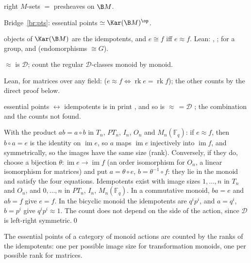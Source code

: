 \begin{trace}
\item[deck] right $M$-sets $=$ presheaves on $\B M$.
\item[arch] Bridge~\ref{br:pts}: essential points $\simeq\Kar(\B M)^{\op}$.
\item[specialise] objects of $\Kar(\B M)$ are the idempotents, and $e\cong f$ iff $e\approx f$. Lean: , ; for a group,  and  (endomorphisms $\cong G$).
\item[rewrite] $\approx$ is $\mathcal D$; count the regular $\mathcal D$-classes monoid by monoid.
\item[verify] Lean, for matrices over any field:  ($e\approx f\iff\operatorname{rk}e = \operatorname{rk}f$); the other counts by the direct proof below. %
\item[novelty] essential points $\leftrightarrow$ idempotents is in print \cite[Cor.~4.2]{rogers-1905}, and so is $\approx\,=\mathcal D$ \cite{costa-steinberg}; the combination and the counts not found.
\end{trace}

\direct{} With the product $ab = a\circ b$ in $T_n$, $PT_n$, $I_n$, $O_n$ and $M_n(\mathbb F_q)$: if $e\approx f$, then $b\circ a = e$ is the identity on $\operatorname{im}e$, so $a$ maps $\operatorname{im}e$ injectively into $\operatorname{im}f$, and symmetrically, so the images have the same size (rank). Conversely, if they do, choose a bijection $\theta : \operatorname{im}e\to\operatorname{im}f$ (an order isomorphism for $O_n$, a linear isomorphism for matrices) and put $a = \theta\circ e$, $b = \theta^{-1}\circ f$: they lie in the monoid and satisfy the four equations. Idempotents exist with image sizes $1,\dots,n$ in $T_n$ and $O_n$, and $0,\dots,n$ in $PT_n$, $I_n$, $M_n(\mathbb F_q)$. In a commutative monoid, $ba = e$ and $ab = f$ give $e = f$. In the bicyclic monoid the idempotents are $q^ip^i$, and $a = q^i$, $b = p^i$ give $q^ip^i\approx 1$. The count does not depend on the side of the action, since $\mathcal D$ is left-right symmetric.\qed

\inwords{} The essential points of a category of monoid actions are counted by the ranks of the idempotents: one per possible image size for transformation monoids, one per possible rank for matrices.
